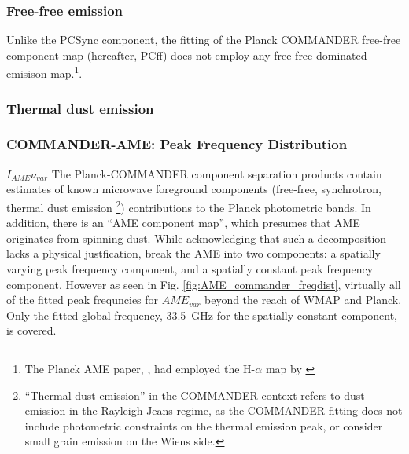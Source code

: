        \subsubsection{Free-free emission}
        Unlike the PCSync component, the fitting of the Planck COMMANDER free-free component map (hereafter, PCff) does not employ any free-free dominated emisison map.\footnote{The Planck AME paper, \cite{planckXV}, had employed the H-$\alpha$ map by \cite{wham98}}.

      \subsubsection{Thermal dust emission}

       \subsubsection{COMMANDER-AME: Peak Frequency Distribution}

        $I_{AME}\nu_{var}$
        The Planck-COMMANDER component separation products contain estimates of known microwave foreground components (free-free, synchrotron, thermal dust emission \footnote{``Thermal dust emission'' in the COMMANDER context refers to dust emission in the Rayleigh Jeans-regime, as the COMMANDER fitting does not include photometric constraints on the thermal emission peak, or consider small grain emission on the Wiens side.}) contributions to the Planck photometric bands. In addition, there is an ``AME component map'', which presumes that AME originates from spinning dust. While acknowledging that such a decomposition lacks a physical justfication, \cite{planck15X} break the AME into two components: a spatially varying peak frequency component, and a spatially constant peak frequency component. However as seen in Fig. \ref{fig:AME_commander_freqdist}, virtually all of the fitted peak frequncies for $AME_{var}$ beyond the reach of WMAP and Planck. Only the fitted global frequency, 33.5~GHz for the spatially constant component, is covered.


